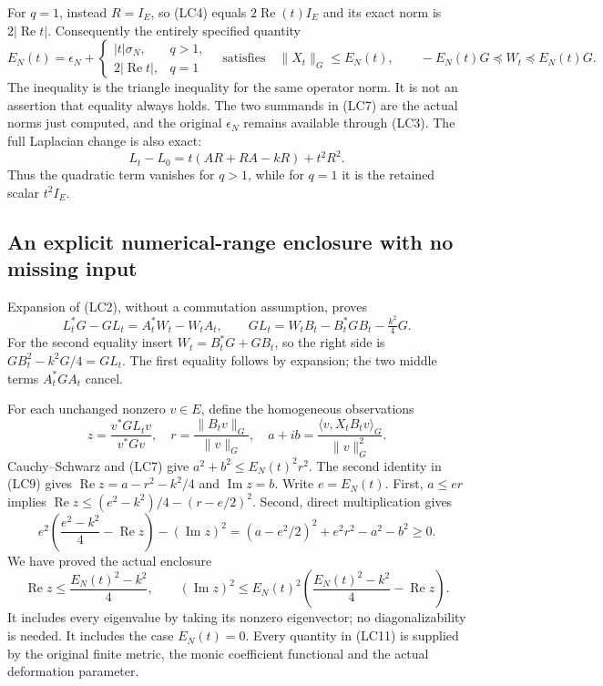 \documentclass{article}
\begin{document}
For \(q=1\), instead \(R=I_E\), so (LC4) equals
\(2\operatorname{Re}(t)I_E\) and its exact norm is
\(2|\operatorname{Re}t|\). Consequently the entirely specified
quantity
\[
 E_N(t)=\epsilon_N+
 \begin{cases}|t|\sigma_N,&q>1,\\
               2|\operatorname{Re}t|,&q=1
 \end{cases}
 \quad\text{satisfies}\quad
 \|X_t\|_G\le E_N(t),\qquad
 -E_N(t)G\preceq W_t\preceq E_N(t)G.
 \tag{LC7}
\]
The inequality is the triangle inequality for the same operator
norm. It is not an assertion that equality always holds. The two
summands in (LC7) are the actual norms just computed, and the
original \(\epsilon_N\) remains available through (LC3).
The full Laplacian change is also exact:
\[
 L_t-L_0=t(AR+RA-kR)+t^2R^2.
 \tag{LC8}
\]
Thus the quadratic term vanishes for \(q>1\), while for \(q=1\)
it is the retained scalar \(t^2I_E\).

\subsection{An explicit numerical-range enclosure with no missing input}

Expansion of (LC2), without a commutation assumption, proves
\[
 L_t^*G-GL_t=A_t^*W_t-W_tA_t,\qquad
 GL_t=W_tB_t-B_t^*GB_t-\tfrac{k^2}{4}G.
 \tag{LC9}
\]
For the second equality insert
\(W_t=B_t^*G+GB_t\), so the right side is
\(GB_t^2-k^2G/4=GL_t\). The first equality follows by expansion;
the two middle terms \(A_t^*GA_t\) cancel.

For each unchanged nonzero \(v\in E\), define the homogeneous
observations
\[
 z=\frac{v^*GL_tv}{v^*Gv},\quad
 r=\frac{\|B_tv\|_G}{\|v\|_G},\quad
 a+ib=\frac{\langle v,X_tB_tv\rangle_G}{\|v\|_G^2}.
 \tag{LC10}
\]
Cauchy--Schwarz and (LC7) give
\(a^2+b^2\le E_N(t)^2r^2\). The second identity in (LC9) gives
\(\operatorname{Re}z=a-r^2-k^2/4\) and
\(\operatorname{Im}z=b\). Write \(e=E_N(t)\). First,
\(a\le er\) implies
\(\operatorname{Re}z\le(e^2-k^2)/4-(r-e/2)^2\).
Second, direct multiplication gives
\[
 e^2\left(\frac{e^2-k^2}{4}-\operatorname{Re}z\right)
    -(\operatorname{Im}z)^2
   =(a-e^2/2)^2+e^2r^2-a^2-b^2\ge0.
\]
We have proved the actual enclosure
\[
 \boxed{\operatorname{Re}z\le\frac{E_N(t)^2-k^2}{4},\qquad
 (\operatorname{Im}z)^2\le E_N(t)^2
       \left(\frac{E_N(t)^2-k^2}{4}-\operatorname{Re}z\right).}
 \tag{LC11}
\]
It includes every eigenvalue by taking its nonzero eigenvector;
no diagonalizability is needed. It includes the case \(E_N(t)=0\).
Every quantity in (LC11) is supplied by the original finite metric,
the monic coefficient functional and the actual deformation parameter.
\end{document}
